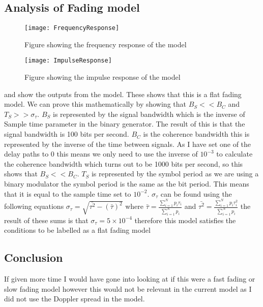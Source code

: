 {	\subsection{Analysis of Fading model}{
		\begin{figure}
			\centering
			\texttt{[image: FrequencyResponse]}
			\caption{Figure showing the frequency response of the model}
			\label{fig:FreqResponse}
		\end{figure}
		\begin{figure}
			\centering
			\texttt{[image: ImpulseResponse]}
			\caption{Figure showing the impulse response of the model}
			\label{fig:ImplResponse}
		\end{figure}
		 and  show the outputs from the model. These shows that this is a flat fading model. We can prove this mathematically by showing that $B_S << B_C$ and $T_S >> \sigma_\tau$. $B_S$ is represented by the signal bandwidth which is the inverse of Sample time parameter in the binary generator. The result of this is that the signal bandwidth is 100 bits per second. $B_C$ is the coherence bandwidth this is represented by the inverse of the time between signals. As I have set one of the delay paths to 0 this means we only need to use the inverse of $10^{-3}$ to calculate the coherence bandwidth which turns out to be 1000 bits per second, so this shows that $B_S << B_C$. 
		$T_S$ is represented by the symbol period as we are using a binary modulator the symbol period is the same as the bit period. This means that it is equal to the sample time set to $10^{-2}$. $\sigma_\tau$ can be found using the following equations $\sigma_\tau = \sqrt{\bar{\tau^2}-(\bar{\tau})^2}$ where $\bar{\tau} = \frac{\sum_{i=1}^{N}p_i\tau_i}{\sum_{i=1}^{N}p_i}$ and $\bar{\tau^2} = \frac{\sum_{i=1}^{N}p_i\tau^2_i}{\sum_{i=1}^{N}p_i}$ the result of these sums is that $\sigma_\tau = 5\times10^{-4}$ therefore this model satisfies the conditions to be labelled as a flat fading model
	}
	\subsection{Conclusion}
	{
		If given more time I would have gone into looking at if this were a fast fading or slow fading model however this would not be relevant in the current model as I did not use the Doppler spread in the model.
	}
}
